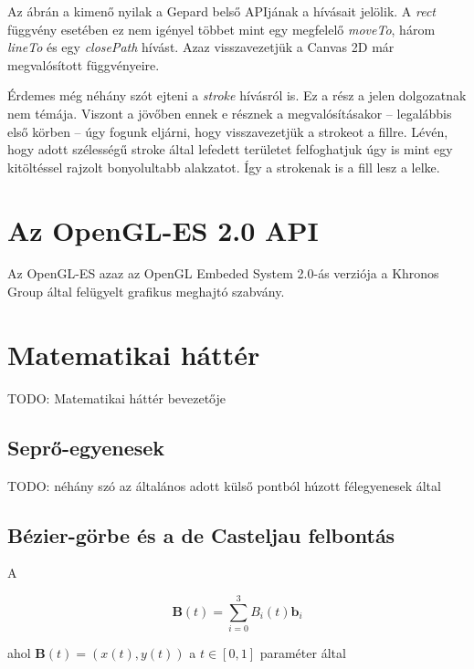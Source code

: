 \documentclass[12pt]{report}
\theoremstyle{definition}
\begin{document}
  Az ábrán a kimenő nyilak a Gepard belső APIjának a hívásait
jelölik. A \emph{rect} függvény esetében ez nem igényel többet
mint egy megfelelő \emph{moveTo}, három \emph{lineTo} és egy
\emph{closePath} hívást. Azaz visszavezetjük a Canvas 2D már
megvalósított függvényeire.

  Érdemes még néhány szót ejteni a \emph{stroke} hívásról is. Ez
a rész a jelen dolgozatnak nem témája. Viszont a jövőben ennek e
résznek a megvalósításakor -- legalábbis első körben -- úgy fogunk
eljárni, hogy visszavezetjük a strokeot a fillre. Lévén, hogy adott
szélességű stroke által lefedett területet felfoghatjuk úgy is mint egy
kitöltéssel rajzolt bonyolultabb alakzatot. Így a strokenak is a fill
lesz a lelke.

    \section[GLES2 API]{Az OpenGL-ES 2.0 API}
    \label{GLES2 API}

  Az OpenGL-ES azaz az OpenGL Embeded System 2.0-ás verziója a
Khronos Group által felügyelt grafikus meghajtó szabvány.

    \section[Matematikai háttér]{Matematikai háttér}
    \label{Matematikai háttér}

  TODO: Matematikai háttér bevezetője

    \subsection{Seprő-egyenesek}
    \label{Seprő-egyenesek}

  TODO: néhány szó az általános adott külső pontból húzott
félegyenesek által

    \subsection{Bézier-görbe és a de Casteljau felbontás}
    \label{Bézier-görbe és a de Casteljau felbontás}

  A

\begin{equation}
%
\mathbf{B}(t)=\sum_{i=0}^{3} B_i(t) \mathbf{b}_i %
\end{equation}

ahol $\mathbf{B}(t)=(x(t), y(t))$ a $t\in[0,1]$ paraméter által
\end{document}
